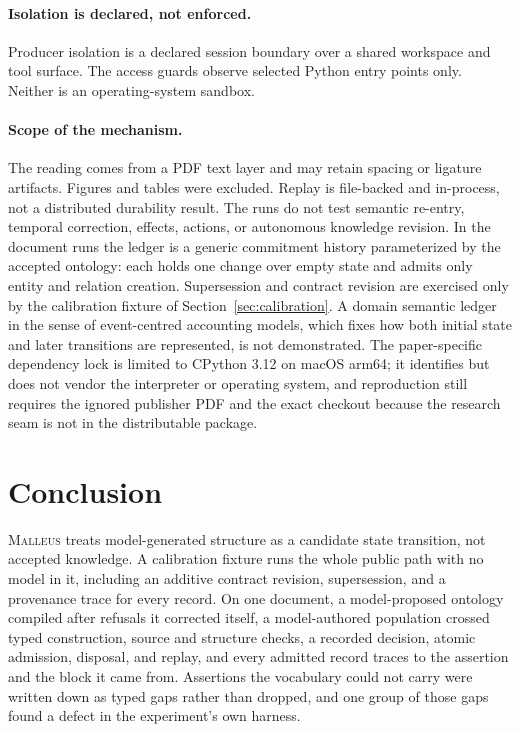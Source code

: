 \documentclass[10pt]{article}
\newcommand{\malleus}{\textsc{Malleus}}
\begin{document}
\paragraph{Isolation is declared, not enforced.} Producer isolation is a declared session boundary over a shared workspace and tool surface. The access guards observe selected Python entry points only. Neither is an operating-system sandbox.

\paragraph{Scope of the mechanism.} The reading comes from a PDF text layer and may retain spacing or ligature artifacts. Figures and tables were excluded. Replay is file-backed and in-process, not a distributed durability result. The runs do not test semantic re-entry, temporal correction, effects, actions, or autonomous knowledge revision. In the document runs the ledger is a generic commitment history parameterized by the accepted ontology: each holds one change over empty state and admits only entity and relation creation. Supersession and contract revision are exercised only by the calibration fixture of Section~\ref{sec:calibration}. A domain semantic ledger in the sense of event-centred accounting models, which fixes how both initial state and later transitions are represented, is not demonstrated. The paper-specific dependency lock is limited to CPython 3.12 on macOS arm64; it identifies but does not vendor the interpreter or operating system, and reproduction still requires the ignored publisher PDF and the exact checkout because the research seam is not in the distributable package.

\section{Conclusion}

\malleus{} treats model-generated structure as a candidate state transition, not accepted knowledge. A calibration fixture runs the whole public path with no model in it, including an additive contract revision, supersession, and a provenance trace for every record. On one document, a model-proposed ontology compiled after refusals it corrected itself, a model-authored population crossed typed construction, source and structure checks, a recorded decision, atomic admission, disposal, and replay, and every admitted record traces to the assertion and the block it came from. Assertions the vocabulary could not carry were written down as typed gaps rather than dropped, and one group of those gaps found a defect in the experiment's own harness.
\end{document}
